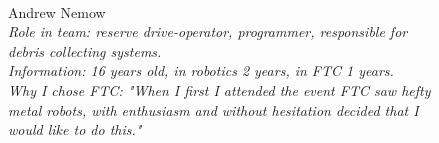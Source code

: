 \begin{figure}[H]
	\begin{minipage}{0.47\linewidth}
		\\
	\end{minipage}
	\hfill
	\begin{minipage}{0.47\linewidth}
		Andrew Nemow\\
		\emph{Role in team: reserve drive-operator, programmer, responsible for debris collecting systems.\\}
		\emph{Information: 16 years old, in robotics 2 years, in FTC 1 years.\\} 
		\emph{Why I chose FTC: "When I first I attended the event FTC saw hefty metal robots, with enthusiasm and without hesitation decided that I would like to do this."}				
	\end{minipage}
	\vfill
\end{figure}

